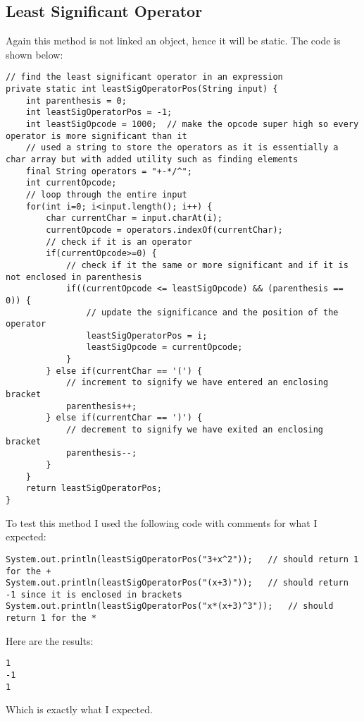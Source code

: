 \documentclass[../../../../main.tex]{subfiles}
\begin{document}
\subsection{Least Significant Operator}
Again this method is not linked an object, hence it will be static. The code is shown below:
\begin{verbatim}
// find the least significant operator in an expression
private static int leastSigOperatorPos(String input) {
	int parenthesis = 0;
	int leastSigOperatorPos = -1;
	int leastSigOpcode = 1000;	// make the opcode super high so every operator is more significant than it
	// used a string to store the operators as it is essentially a char array but with added utility such as finding elements
	final String operators = "+-*/^";
	int currentOpcode;
	// loop through the entire input
	for(int i=0; i<input.length(); i++) {
		char currentChar = input.charAt(i);
		currentOpcode = operators.indexOf(currentChar);
		// check if it is an operator
		if(currentOpcode>=0) {
			// check if it the same or more significant and if it is not enclosed in parenthesis
			if((currentOpcode <= leastSigOpcode) && (parenthesis == 0)) {
				// update the significance and the position of the operator
				leastSigOperatorPos = i;
				leastSigOpcode = currentOpcode;
			}
		} else if(currentChar == '(') {
			// increment to signify we have entered an enclosing bracket
			parenthesis++;
		} else if(currentChar == ')') {
			// decrement to signify we have exited an enclosing bracket
			parenthesis--;
		}
	}
	return leastSigOperatorPos;
}
\end{verbatim}
To test this method I used the following code with comments for what I expected:
\begin{verbatim}
System.out.println(leastSigOperatorPos("3+x^2"));	// should return 1 for the +
System.out.println(leastSigOperatorPos("(x+3)"));	// should return -1 since it is enclosed in brackets
System.out.println(leastSigOperatorPos("x*(x+3)^3"));	// should return 1 for the *
\end{verbatim}
Here are the results:
\begin{verbatim}
1
-1
1
\end{verbatim}
Which is exactly what I expected.
\newpage
\end{document}
